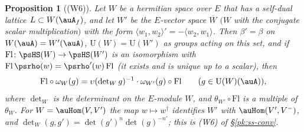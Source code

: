 \documentclass[10pt]{amsart}
\newtheorem{proposition}[theorem]{Proposition}
\theoremstyle{definition}
\theoremstyle{remark}
\providecommand{\auU}{\mathrm U}
\providecommand{\aubar}[1]{\overline{#1}}
\begin{document}
\begin{proposition}[{\rm(W6)}]\label{pf:flip}
Let $W$ be a hermitian space over $E$ that has a self-dual lattice $L\subset W(\auA_f)$, and let
$W'$ be the $E$-vector space $\aubar W$ $(W$ with the conjugate scalar multiplication$)$ with the
form $\langle w_1,w_2\rangle'=-\langle w_2,w_1\rangle$. Then $\beta'=\beta$ on $W(\auA)=W'(\auA)$,
$\auU(W)=\auU(W')$ as groups acting on this set, and if $\mathrm{Fl}\colon\psHS(W)\to\psHS(W')$ is
an isomorphism with $\mathrm{Fl}\,\psrho(w)=\psrho'(w)\,\mathrm{Fl}$ (it exists and is unique up
to a scalar), then
\[
\mathrm{Fl}\circ\omega_W(g)=\upsilon(\det\nolimits_Wg)^{-1}\cdot\omega_{W'}(g)\circ\mathrm{Fl}
\qquad(g\in\auU(W)(\auA)),
\]
where $\det_W$ is the determinant on the $E$-module $W$, and $\theta_{W'}\circ\mathrm{Fl}$ is a
multiple of $\theta_W$. For $W=\auHom(V,V')$ the map $w\mapsto w^\dagger$ identifies $W'$ with
$\auHom(V',V^-)$, and $\det_W(g,g')=\det(g')^{n}\det(g)^{-n'}$; this is {\rm(W6)} of
\S\ref{pk:ss-conv}.
\end{proposition}
\end{document}
